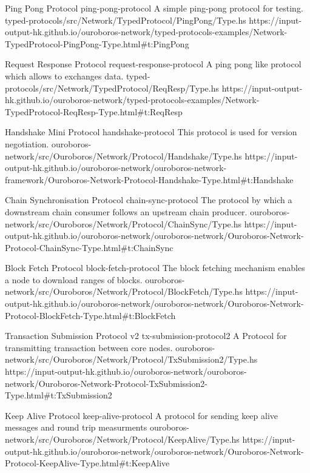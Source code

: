 \miniEntry
    {Ping Pong Protocol}
    {ping-pong-protocol}
    {A simple ping-pong protocol for testing.}
    {typed-protocols/src/Network/TypedProtocol/PingPong/Type.hs}
    {https://input-output-hk.github.io/ouroboros-network/typed-protocols-examples/Network-TypedProtocol-PingPong-Type.html\#t:PingPong}

\miniEntry
    {Request Response Protocol}
    {request-response-protocol}
    {A ping pong like protocol which allows to exchanges data.}
    {typed-protocols/src/Network/TypedProtocol/ReqResp/Type.hs}
    {https://input-output-hk.github.io/ouroboros-network/typed-protocols-examples/Network-TypedProtocol-ReqResp-Type.html\#t:ReqResp}

\miniEntry
    {Handshake Mini Protocol}
    {handshake-protocol}
    {This protocol is used for version negotiation.}
    {ouroboros-network/src/Ouroboros/Network/Protocol/Handshake/Type.hs}
    {https://input-output-hk.github.io/ouroboros-network/ouroboros-network-framework/Ouroboros-Network-Protocol-Handshake-Type.html\#t:Handshake}

\miniEntry
    {Chain Synchronisation Protocol}
    {chain-sync-protocol}
    {The protocol by which a downstream chain consumer follows an upstream chain producer.}
    {ouroboros-network/src/Ouroboros/Network/Protocol/ChainSync/Type.hs}
    {https://input-output-hk.github.io/ouroboros-network/ouroboros-network/Ouroboros-Network-Protocol-ChainSync-Type.html\#t:ChainSync}

\miniEntry
    {Block Fetch Protocol}
    {block-fetch-protocol}
    {The block fetching mechanism enables a node to download ranges of blocks.}
    {ouroboros-network/src/Ouroboros/Network/Protocol/BlockFetch/Type.hs}
    {https://input-output-hk.github.io/ouroboros-network/ouroboros-network/Ouroboros-Network-Protocol-BlockFetch-Type.html\#t:BlockFetch}

\miniEntry
    {Transaction Submission Protocol v2}
    {tx-submission-protocol2}
    {A Protocol for transmitting transaction between core nodes.}
    {ouroboros-network/src/Ouroboros/Network/Protocol/TxSubmission2/Type.hs}
    {https://input-output-hk.github.io/ouroboros-network/ouroboros-network/Ouroboros-Network-Protocol-TxSubmission2-Type.html\#t:TxSubmission2}

\miniEntry
    {Keep Alive Protocol}
    {keep-alive-protocol}
    {A protocol for sending keep alive messages and round trip measurments}
    {ouroboros-network/src/Ouroboros/Network/Protocol/KeepAlive/Type.hs}
    {https://input-output-hk.github.io/ouroboros-network/ouroboros-network/Ouroboros-Network-Protocol-KeepAlive-Type.html\#t:KeepAlive}


